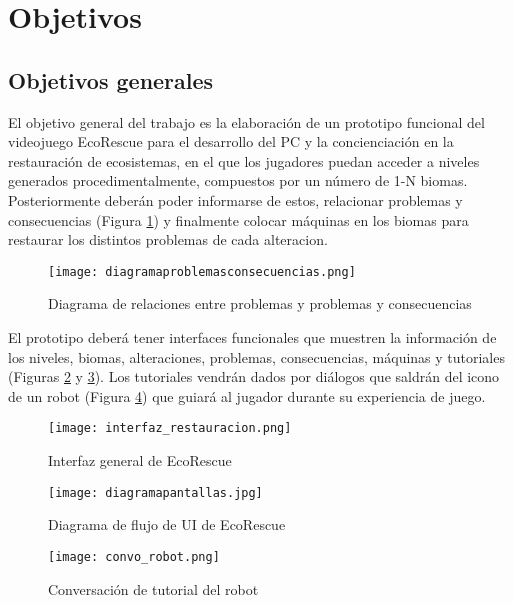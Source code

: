 \raggedbottom
\section{Objetivos}
\subsection{Objetivos generales}
El objetivo general del trabajo es la elaboración de un prototipo funcional del videojuego EcoRescue para el desarrollo del PC y la concienciación en la restauración de ecosistemas, 
en el que los jugadores puedan acceder a niveles generados procedimentalmente, compuestos por un número
de 1-N biomas. Posteriormente deberán poder informarse de estos, relacionar problemas y consecuencias (Figura \ref{fig:diagconsecuencias}) y finalmente 
colocar máquinas en los biomas para restaurar los distintos problemas de cada alteracion.

\begin{figure}[H]
  \centering
    \texttt{[image: diagramaproblemasconsecuencias.png]}
  \caption{Diagrama de relaciones entre problemas y problemas y consecuencias}
  \label{fig:diagconsecuencias}
\end{figure}

El prototipo deberá tener interfaces funcionales que muestren la información de los niveles, biomas, alteraciones, problemas, consecuencias, máquinas y tutoriales (Figuras \ref{fig:UI} y \ref{fig:diagUI}). Los tutoriales vendrán dados por diálogos que saldrán del 
icono de un robot (Figura \ref{fig:robot}) que guiará al jugador durante su experiencia de juego.

\begin{figure}[H]
    \centering
      \texttt{[image: interfaz\_restauracion.png]}
    \caption{Interfaz general de EcoRescue}
    \label{fig:UI}
\end{figure}

\begin{figure}[H]
    \centering
      \texttt{[image: diagramapantallas.jpg]}
    \caption{Diagrama de flujo de UI de EcoRescue}
    \label{fig:diagUI}
\end{figure}

\begin{figure}[H]
    \centering
      \texttt{[image: convo\_robot.png]}
    \caption{Conversación de tutorial del robot}
    \label{fig:robot}
\end{figure}

